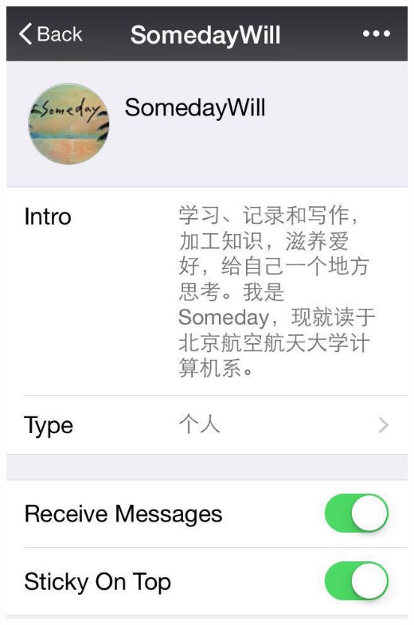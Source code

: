 \documentclass{ctexart}
\begin{document}
\begin{center}
\includegraphics[scale=0.4]{SomedayWill_introduction.jpeg}
\end{center}


\clearpage
\tableofcontents
\clearpage



\renewcommand{\headrulewidth}{0.4pt} %

\end{document}
